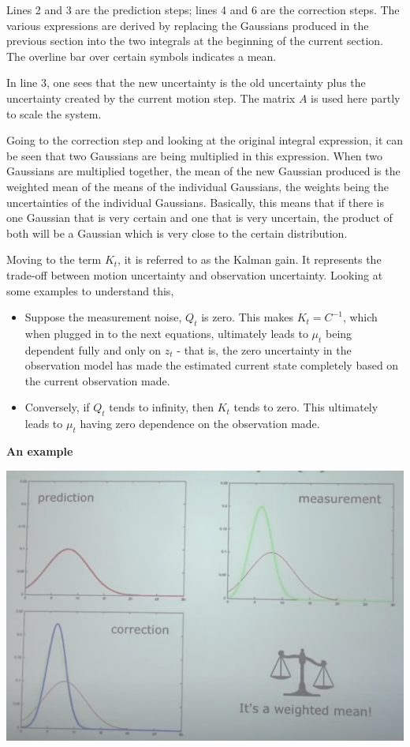 \documentclass[a4paper]{article}
\begin{document}
Lines 2 and 3 are the prediction steps; lines 4 and 6 are the correction steps. The various expressions are derived by replacing the Gaussians produced in the previous section into the two integrals at the beginning of the current section. The overline bar over certain symbols indicates a mean.

In line 3, one sees that the new uncertainty is the old uncertainty plus the uncertainty created by the current motion step. The matrix $A$ is used here partly to scale the system.

Going to the correction step and looking at the original integral expression, it can be seen that two Gaussians are being multiplied in this expression. When two Gaussians are multiplied together, the mean of the new Gaussian produced is the weighted mean of the means of the individual Gaussians, the weights being the uncertainties of the individual Gaussians. Basically, this means that if there is one Gaussian that is very certain and one that is very uncertain, the product of both will be a Gaussian which is very close to the certain distribution.

Moving to the term $K_t$, it is referred to as the Kalman gain. It represents the trade-off between motion uncertainty and observation uncertainty. Looking at some examples to understand this,

\begin{itemize}
    \item Suppose the measurement noise, $Q_t$ is zero. This makes $K_t = C^{-1}$, which when plugged in to the next equations, ultimately leads to $\mu_t$ being dependent fully and only on $z_t$ - that is, the zero uncertainty in the observation model has made the estimated current state completely based on the current observation made.
    \item Conversely, if $Q_t$ tends to infinity, then $K_t$ tends to zero. This ultimately leads to $\mu_t$ having zero dependence on the observation made.
\end{itemize}

\textbf{An example}

\begin{center}
    \includegraphics[scale=0.5]{1dkalmeg1}
\end{center}
\end{document}
